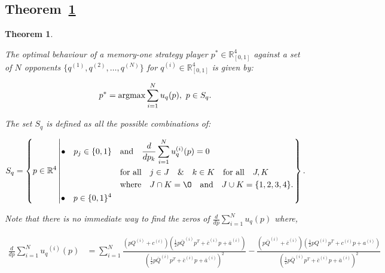 \documentclass[10pt]{article}
\newcommand{\R}{\mathbb{R}}
\newtheorem{theorem}{Theorem}
\begin{document}
\subsection{Theorem~\ref{memone_group_best_response}}\label{appendix:memone_group_best_response}
\begin{theorem}\label{memone_group_best_response}

The optimal behaviour of a memory-one strategy player \(p^* \in \R_{[0, 1]} ^
4\) against a set of \(N\) opponents \(\{q^{(1)}, q^{(2)}, \dots, q^{(N)} \}\)
for \(q^{(i)} \in \R_{[0, 1]} ^ 4\) is given by:

\[p^* = \textnormal{argmax}\sum\limits_{i=1} ^ N  u_q(p), \ p \in S_q.\]

The set \(S_q\) is defined as all the possible combinations of:

{\scriptsize
\begin{equation}\label{eq:s_q_set}
    S_q =
    \left\{p \in \mathbb{R} ^ 4 \left|
        \begin{aligned}
            \bullet\quad p_j \in \{0, 1\} & \quad \text{and} \quad \frac{d}{dp_k}
            \sum\limits_{i=1} ^ N  u_q^{(i)}(p) = 0 \\
            & \quad \text{for all} \quad j \in J \quad \&  \quad k \in K  \quad \text{for all} \quad J, K \\
            & \quad \text{where} \quad J \cap K = \O \quad
            \text{and} \quad J \cup K = \{1, 2, 3, 4\}.\\
            \bullet\quad  p \in \{0, 1\} ^ 4
        \end{aligned}\right.
    \right\}.
\end{equation}
}

Note that there is no immediate way to find the zeros of \(\frac{d}{dp}
\sum\limits_{i=1} ^ N  u_q(p)\) where,

{\scriptsize
\begin{align}\label{eq:mo_tournament_derivative}
    \frac{d}{dp} \sum\limits_{i=1} ^ {N} {u_q}^{(i)} (p) & = \displaystyle\sum\limits_{i=1} ^ {N}
    \frac{\left(pQ^{(i)} + c^{(i)}\right) \left(\frac{1}{2} p\bar{Q}^{(i)} p^T + \bar{c}^{(i)} p + \bar{a}^ {(i)}\right)}
    {\left(\frac{1}{2} p\bar{Q}^{(i)} p^T + \bar{c}^{(i)} p + \bar{a}^ {(i)}\right)^ 2}
    - \frac{\left(p\bar{Q}^{(i)} + \bar{c}^{(i)}\right) \left(\frac{1}{2} pQ^{(i)} p^T + c^{(i)} p + a^ {(i)}\right)}
    {\left(\frac{1}{2} p\bar{Q}^{(i)} p^T + \bar{c}^{(i)} p + \bar{a}^ {(i)}\right)^ 2}
\end{align}
}


\end{theorem}
\end{document}
